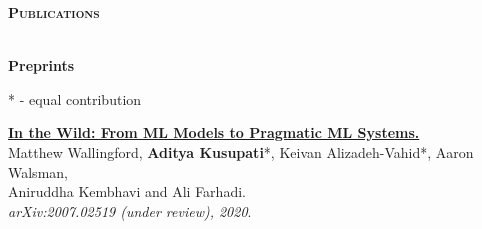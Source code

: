 \documentclass[10pt]{article}
\renewcommand{\section}[1]{
\bigskip
  \begin{Large}
  {\textsc{\textbf{#1}}}
  \end{Large}
  \hrulefill
  \medskip
  \\
}
\newcommand{\homepage}{https://homes.cs.washington.edu/~kusupati}
\begin{document}
\section{Publications}
\label{sec:pubs}
\textbf{\large{Preprints}}\hfill\begin{footnotesize}{* - equal contribution}\end{footnotesize}
\begin{etaremune}
\item \href{\homepage/pubs/wallingford20.pdf}{\textbf{In the Wild: From ML Models to Pragmatic ML Systems.}}\\
Matthew Wallingford, \textbf{Aditya Kusupati}*, Keivan Alizadeh-Vahid*, Aaron Walsman, \\Aniruddha Kembhavi and Ali Farhadi.\\
\emph{arXiv:2007.02519 (under review), 2020}.
\end{etaremune}
\end{document}
